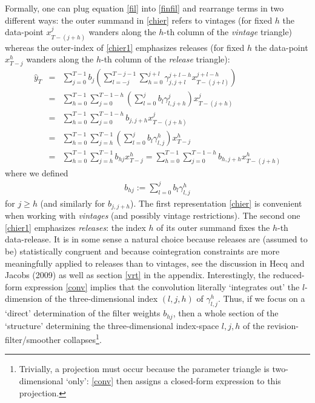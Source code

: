 \documentclass[11pt]{article}
\begin{document}
Formally, one can plug equation \ref{fil} into \ref{finfil} and rearrange terms in two different ways: the outer summand in \ref{chier} refers to vintages (for fixed $h$ the data-point $x_{T-(j+h)}^j$ wanders along the $h$-th column of the \emph{vintage} triangle) whereas the outer-index of \ref{chier1} emphasizes releases (for fixed $h$ the data-point $x_{T-j}^h$ wanders along the $h$-th column of the \emph{release} triangle):
\begin{eqnarray}
\hat{y}_T&=&\sum_{j=0}^{T-1}b_j\left(\sum_{l=-j}^{T-j-1}\sum_{h=0}^{j+l} \gamma_{j,j+l}^{j+l-h}x_{T-(j+l)}^{j+l-h}\right)\label{indl}\\
&=&\sum_{h=0}^{T-1}\sum_{j=0}^{T-1-h} \left(\sum_{l=0}^{j} b_l\gamma_{l,j+h}^{j}\right)x_{T-(j+h)}^{j}\nonumber\\
&=&\sum_{h=0}^{T-1}\sum_{j=0}^{T-1-h} b_{j,j+h}x_{T-(j+h)}^{j}\label{chier}\\
&=&\sum_{h=0}^{T-1}\sum_{j=h}^{T-1} \left(\sum_{l=0}^{j} b_l\gamma_{l,j}^{h}\right)x_{T-j}^{h}\nonumber\\
&=&\sum_{h=0}^{T-1}\sum_{j=h}^{T-1} b_{hj}x_{T-j}^{h}=\sum_{h=0}^{T-1}\sum_{j=0}^{T-1-h} b_{h,j+h}x_{T-(j+h)}^{h}\label{chier1}
\end{eqnarray}
where we defined
\begin{eqnarray}
b_{hj}:=\sum_{l=0}^{j} b_l\gamma_{l,j}^{h}\label{conv}
\end{eqnarray}
for $j\geq h$ (and similarly for $b_{j,j+h}$). The first representation \ref{chier} is convenient when working with \emph{vintages} (and possibly vintage restrictions). The second one \ref{chier1} emphasizes \emph{releases}: the index $h$ of its outer summand fixes the $h$-th data-release. It is in some sense  a natural choice because releases are (assumed to be) statistically congruent and because cointegration constraints are more meaningfully applied to releases than to vintages, see the discussion in Hecq and Jacobs (2009) as well as section \ref{vrt} in the appendix. Interestingly, the reduced-form expression \ref{conv} implies that the convolution literally {`integrates out' the $l$-dimension} of the three-dimensional index $(l,j,h)$ of $\gamma_{l,j}^{h}$. Thus, if we focus on a `direct'  determination of the filter weights $b_{hj}$, then a whole section of the `structure' determining the three-dimensional index-space $l,j,h$ of the revision-filter/smoother collapses\footnote{Trivially, a projection must occur because the parameter triangle is two-dimensional `only': \ref{conv} then assigns a closed-form expression to  this projection.}.  \\
\end{document}
